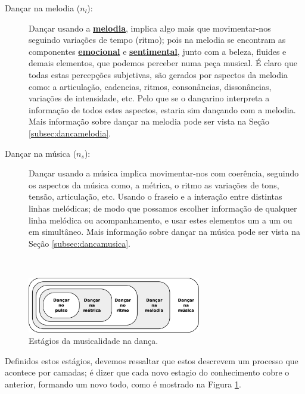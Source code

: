 \begin{description}
\item[Dançar na melodia  ($n_l$):] Dançar usando a \hyperref[sec:pos:Melodia]{\textbf{melodia}},
implica algo mais que movimentar-nos seguindo variações de tempo (ritmo); 
pois na melodia se encontram as componentes \hyperref[ref:emotionsentimental]{\textbf{emocional}} 
e \hyperref[ref:emotionsentimental]{\textbf{sentimental}}, junto com a beleza, fluides e demais elementos, 
que podemos perceber numa peça musical.
É claro que todas estas percepções subjetivas, 
são gerados por aspectos da melodia como: a articulação, cadencias, ritmos, consonâncias, dissonâncias,
variações de intensidade, etc. 
Pelo que se o dançarino interpreta a informação de todos estes aspectos,
estaria sim dançando com a melodia.
Mais informação sobre dançar na melodia pode ser vista na Seção \ref{subsec:dancamelodia}.
\item[Dançar na música  ($n_s$):] 
Dançar usando a música implica movimentar-nos com coerência, 
seguindo os aspectos da música como, a métrica, 
o ritmo as variações de tons, tensão, articulação, etc.
Usando o fraseio e a interação entre distintas linhas melódicas;
de modo que possamos escolher informação de qualquer linha melódica ou acompanhamento,
e usar estes elementos um a um ou em simultâneo.
Mais informação sobre dançar na música pode ser vista na Seção \ref{subsec:dancamusica}.
\end{description}
~

\begin{figure}
    \centering
    \vspace{-10pt}
    \includegraphics[width=0.675\textwidth]{chapters/cap-musicalidade-tecnica/aspectos-musica.eps}
    \caption{Estágios da musicalidade na dança.}
    \vspace{-10pt}
    \label{fig:aspectos-musica}
\end{figure}
Definidos estos estágios, 
devemos ressaltar que estos descrevem um processo que acontece por camadas;
é dizer que cada novo estagio do conhecimento cobre o anterior, formando um novo todo,
como é mostrado na Figura \ref{fig:aspectos-musica}.

